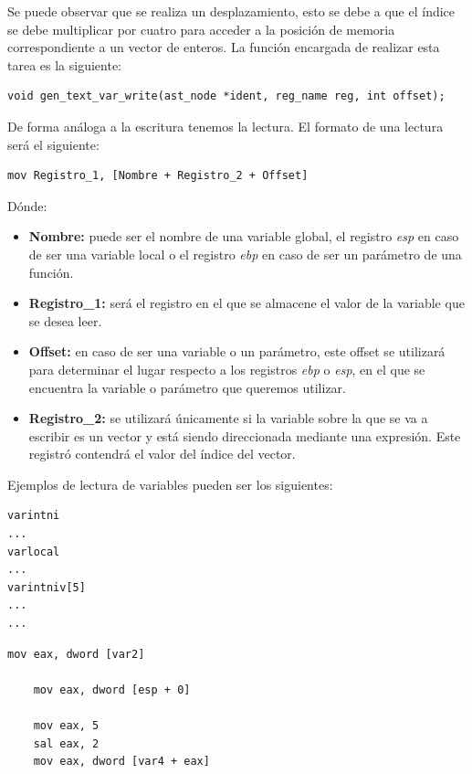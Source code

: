 \documentclass[a4paper,10pt]{article}
\begin{document}
Se puede observar que se realiza un desplazamiento, esto se debe a que el índice se debe multiplicar por cuatro para acceder a la posición de memoria correspondiente a un vector de enteros. La función encargada de realizar esta tarea es la siguiente:

\begin{lstlisting}
void gen_text_var_write(ast_node *ident, reg_name reg, int offset);
\end{lstlisting}

De forma análoga a la escritura tenemos la lectura. El formato de una lectura será el siguiente:
\begin{lstlisting}
mov Registro_1, [Nombre + Registro_2 + Offset]
\end{lstlisting}
\noindent Dónde:
\begin{itemize}
\item \textbf{Nombre:} puede ser el nombre de una variable global, el registro \textit{esp} en caso de ser una variable local o el registro \textit{ebp} en caso de ser un parámetro de una función.
\item \textbf{Registro\_1:} será el registro en el que se almacene el valor de la variable que se desea leer.
\item \textbf{Offset:} en caso de ser una variable o un parámetro, este offset se utilizará para determinar el lugar respecto a los registros \textit{ebp} o \textit{esp}, en el que se encuentra la variable o parámetro que queremos utilizar.
\item \textbf{Registro\_2:} se utilizará únicamente si la variable sobre la que se va a escribir es un vector y está siendo direccionada mediante una expresión. Este registró contendrá el valor del índice del vector.
\end{itemize}


Ejemplos de lectura de variables pueden ser los siguientes:

\begin{multicols}{2}
\begin{lstlisting}[language=jam,frame=single]
varintni
...
varlocal
...
varintniv[5]
...
...
\end{lstlisting}
\begin{lstlisting}[frame=single]
	mov eax, dword [var2]
	
	mov eax, dword [esp + 0]
	
	mov eax, 5
	sal eax, 2
	mov eax, dword [var4 + eax]
\end{lstlisting}
\end{multicols}
\end{document}
